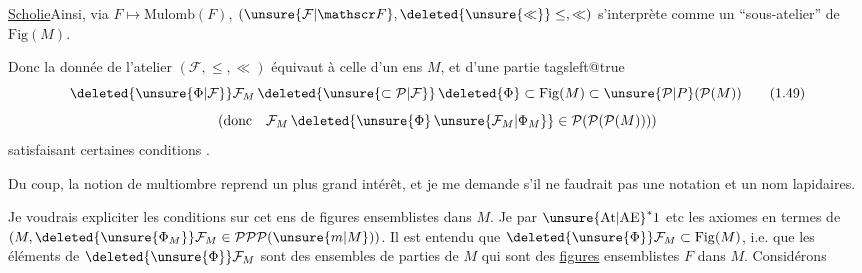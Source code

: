 \uline{Scholie}\quad Ainsi, via $F\longmapsto\mathrm{Mulomb}(F)$,
$(\unsure{\mathcal F|\mathscr F},\deleted{\unsure{\ll}}\leq,\ll)$ s'interprète comme un ``sous-atelier'' de $\mathrm{Fig}(M)$.

Donc la donnée de l'atelier $(\mathcal F,\leq,\ll)$ équivaut à celle d'un ens $M$, et d'une partie
\begingroup\csname tagsleft@true\endcsname
\[
 \deleted{\unsure{\Phi|\mathcal F}}\mathcal F_M\,
 \deleted{\unsure{\subset\mathcal P|\mathcal F}}\,
 \deleted{\Phi}\subset\mathrm{Fig}(M)\subset
 \unsure{\mathcal P|P}(\mathcal P(M))
 \tag*{(1.49)}
\]
\endgroup
\[
 \left(\text{donc}\quad
 \mathcal F_M\,\deleted{\unsure{\Phi}\,\unsure{\mathcal F_M|\Phi_M}}
 \in\mathcal P(\mathcal P(\mathcal P(M)))\right)
\]
satisfaisant certaines conditions .

Du coup, la notion de  multiombre reprend un plus grand intérêt, et je me demande s'il ne faudrait pas une notation  et un nom  lapidaires.

Je voudrais expliciter les conditions sur cet ens de figures ensemblistes dans $M$. Je  par ${\unsure{\mathrm{At}|\mathrm{AE}}}^{*}1$ etc les axiomes en termes de $(M,\deleted{\unsure{\Phi_M}}\mathcal F_M\in\mathcal P\mathcal P\mathcal P(\unsure{m|M}))$.
 Il est entendu que $\deleted{\unsure{\Phi}}\mathcal F_M\subset\mathrm{Fig}(M)$, i.e.  que les éléments de $\deleted{\unsure{\Phi}}\mathcal F_M$ sont des ensembles de parties de $M$ qui sont des \uline{figures} ensemblistes $F$ dans $M$.   Considérons
